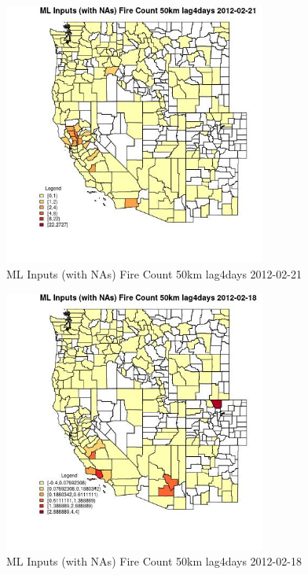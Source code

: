 \begin{figure} 
\centering  
\includegraphics[width=0.77\textwidth]{Code_Outputs/Report_ML_input_PM25_Step4_part_f_de_duplicated_aves_prioritize_24hr_obswNAs_CountyFire_Count_50km_lag4daysMean2012-02-21.jpg} 
\caption{\label{fig:Report_ML_input_PM25_Step4_part_f_de_duplicated_aves_prioritize_24hr_obswNAsCountyFire_Count_50km_lag4daysMean2012-02-21}ML Inputs (with NAs) Fire Count 50km lag4days 2012-02-21} 
\end{figure} 
 

\begin{figure} 
\centering  
\includegraphics[width=0.77\textwidth]{Code_Outputs/Report_ML_input_PM25_Step4_part_f_de_duplicated_aves_prioritize_24hr_obswNAs_CountyFire_Count_50km_lag4daysMean2012-02-18.jpg} 
\caption{\label{fig:Report_ML_input_PM25_Step4_part_f_de_duplicated_aves_prioritize_24hr_obswNAsCountyFire_Count_50km_lag4daysMean2012-02-18}ML Inputs (with NAs) Fire Count 50km lag4days 2012-02-18} 
\end{figure} 
 

